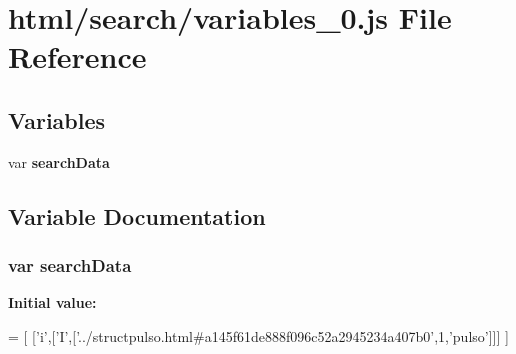 \section{html/search/variables\+\_\+0.js File Reference}
\label{variables__0_8js}
\subsection*{Variables}
\begin{DoxyCompactItemize}
\item 
var {\bf search\+Data}
\end{DoxyCompactItemize}


\subsection{Variable Documentation}
\subsubsection[{search\+Data}]{\setlength{\rightskip}{0pt plus 5cm}var search\+Data}\label{variables__0_8js_ad01a7523f103d6242ef9b0451861231e}
{\bfseries Initial value\+:}
\begin{DoxyCode}
=
[
  [\textcolor{charliteral}{'i'},[\textcolor{charliteral}{'I'},[\textcolor{stringliteral}{'../structpulso.html#a145f61de888f096c52a2945234a407b0'},1,\textcolor{stringliteral}{'pulso'}]]]
]
\end{DoxyCode}
